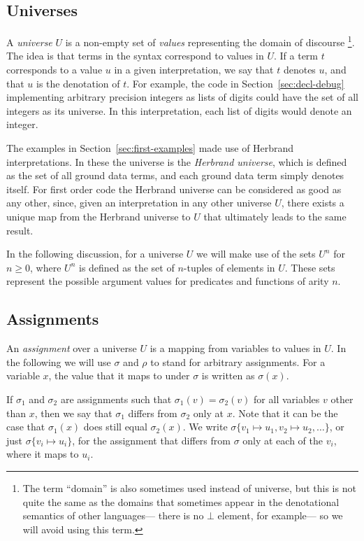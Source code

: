 \subsection{Universes}

A \emph{universe} $U$ is a non-empty set of \emph{values\label{gi:value}}
representing the domain of discourse%
\footnote{
The term ``domain'' is also sometimes used instead of universe,
but this is not quite the same as the domains that sometimes appear
in the denotational semantics of other languages---%
there is no $\bot$ element, for example---%
so we will avoid using this term.
}.
The idea is that terms in the syntax
correspond to values in $U$.
If a term $t$ corresponds to a value $u$
in a given interpretation,
we say that $t$ denotes $u$,
and that $u$ is the denotation of $t$.
For example,
the code in Section~\ref{sec:decl-debug}
implementing arbitrary precision integers as lists of digits
could have the set of all integers as its universe.
In this interpretation,
each list of digits would denote an integer.

The examples in Section~\ref{sec:first-examples}
made use of Herbrand interpretations.
In these the universe is the
\emph{Herbrand universe\label{gi:herbrand-universe}},
which is defined as the set of all ground data terms,
and each ground data term simply denotes itself.
For first order code
the Herbrand universe can be considered as good as any other,
since, given an interpretation in any other universe $U$,
there exists a unique map
from the Herbrand universe to $U$
that ultimately leads to the same result.

In the following discussion,
for a universe $U$
we will make use of the sets $U^n$ for $n \geqslant 0$,
where $U^n$ is defined as the set of $n$-tuples of elements in $U$.
These sets represent the possible argument values
for predicates and functions of arity $n$.


\subsection{Assignments}
\label{sec:assignments}

An \emph{assignment} over a universe $U$
is a mapping from variables to values in $U$.
In the following
we will use $\sigma$ and $\rho$ to stand for arbitrary assignments.
For a variable $x$,
the value that it maps to under $\sigma$ is written as $\sigma(x)$.

If $\sigma_1$ and $\sigma_2$ are assignments such that
$\sigma_1(v) = \sigma_2(v)$
for all variables $v$ other than $x$,
then we say that $\sigma_1$ differs from $\sigma_2$ only at $x$.
Note that it can be the case that
$\sigma_1(x)$ does still equal $\sigma_2(x)$.
We write $\sigma \{ v_1 \mapsto u_1, v_2 \mapsto u_2, \ldots \}$,
or just $\sigma \{ v_i \mapsto u_i \}$,
for the assignment that differs from $\sigma$ only at each of the $v_i$,
where it maps to $u_i$.

